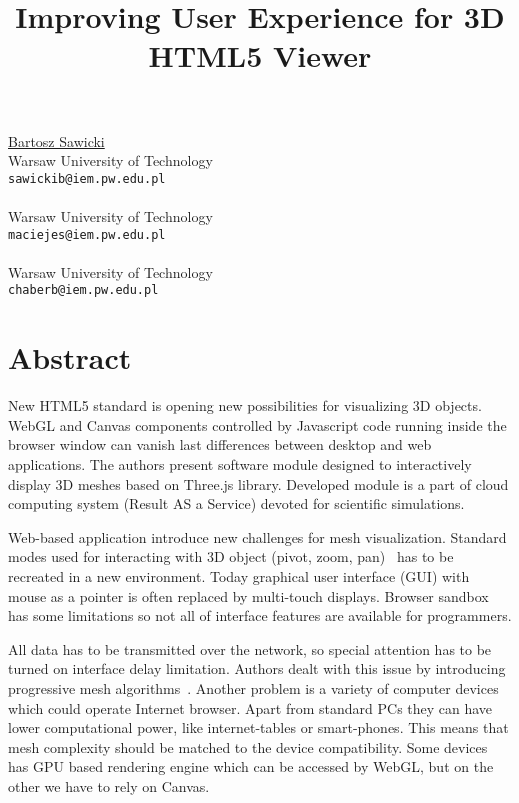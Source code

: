 \title{Improving User Experience for 3D HTML5 Viewer}
 \author{} \institute{}
\maketitle
\begin{center}
{\large \underline{Bartosz Sawicki}}\\
Warsaw University of Technology\\
{\tt sawickib@iem.pw.edu.pl}
\\ \vspace{4mm}{\large Sebastian Maciejewski}\\
Warsaw University of Technology\\
{\tt maciejes@iem.pw.edu.pl}
\\ \vspace{4mm}{\large Bartosz Chaber}\\
Warsaw University of Technology\\
{\tt chaberb@iem.pw.edu.pl}

\end{center}

\section*{Abstract}

New HTML5 standard is opening new possibilities for visualizing 3D objects. WebGL and Canvas components controlled by Javascript code running inside the browser window can vanish last differences between desktop and web applications. The authors present software module designed to interactively display 3D meshes based on Three.js library. Developed module is a part of cloud computing system (Result AS a Service) devoted for scientific simulations.

Web-based application introduce new challenges for mesh visualization. Standard modes used for interacting with 3D object (pivot, zoom, pan)~\cite{hand97} has to be recreated in a new environment. Today graphical user interface (GUI) with mouse as a pointer is often replaced by multi-touch displays. Browser sandbox has some limitations so not all of interface features are available for programmers. 

All data has to be transmitted over the network, so special attention has to be turned on interface delay limitation. Authors dealt with this issue by introducing progressive mesh algorithms~\cite{hopp98}. Another problem is a variety of computer devices which could operate Internet browser. Apart from standard PCs they can have lower computational power, like internet-tables or smart-phones. This means that mesh complexity should be matched to the device compatibility. Some devices has GPU based rendering engine which can be accessed by WebGL, but on the other we have to rely on Canvas.

